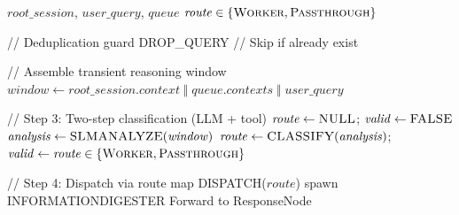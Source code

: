 \documentclass{article}
\begin{document}
\begin{algorithm}[t]
\caption{Query Analysis}
\label{alg:query-analyst}
\begin{algorithmic}[1]
\Require $\mathit{root\_session}$, $\mathit{user\_query}$, $\mathit{queue}$
\Ensure $\mathit{route} \in \{\textsc{Worker}, \textsc{Passthrough}\}$

// Deduplication guard
    \State \Return DROP\_QUERY // Skip if already exist
\EndIf

// Assemble transient reasoning window
\State $\mathit{window} \gets \mathit{root\_session}.\mathit{context} \;\Vert\; \mathit{queue}.\mathit{contexts} \;\Vert\; \mathit{user\_query}$

// Step 3: Two-step classification (LLM + tool)
\State $\mathit{route} \gets \textsc{NULL}$; $\mathit{valid} \gets \textsc{FALSE}$
    \State $\mathit{analysis} \gets \textsc{SLMANALYZE}(\mathit{window})$
    \State $\mathit{route} \gets \textsc{CLASSIFY}(\mathit{analysis})$; $\mathit{valid} \gets \mathit{route} \in \{\textsc{Worker}, \textsc{Passthrough}\}$
\EndWhile

// Step 4: Dispatch via route map
\State \textsc{DISPATCH}($\mathit{route}$)
    \State spawn \textsc{INFORMATIONDIGESTER}
    \State Forward to ResponseNode
\EndIf

\end{algorithmic}
\end{algorithm}
\end{document}
